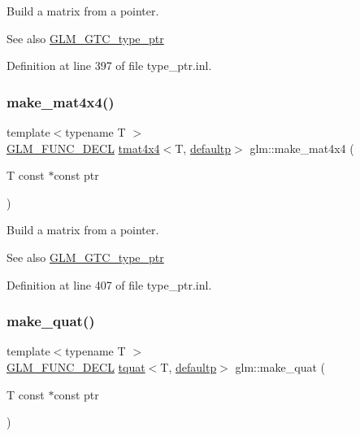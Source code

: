 Build a matrix from a pointer. \begin{DoxySeeAlso}{See also}
\mbox{\hyperlink{group__gtc__type__ptr}{G\+L\+M\+\_\+\+G\+T\+C\+\_\+type\+\_\+ptr}} 
\end{DoxySeeAlso}


Definition at line 397 of file type\+\_\+ptr.\+inl.

\mbox{\label{group__gtc__type__ptr_gaf605a5f5e2ff594e8d404b2855b09541}} 
\subsubsection{\texorpdfstring{make\_mat4x4()}{make\_mat4x4()}}
{\footnotesize\ttfamily template$<$typename T $>$ \\
\mbox{\hyperlink{setup_8hpp_ab2d052de21a70539923e9bcbf6e83a51}{G\+L\+M\+\_\+\+F\+U\+N\+C\+\_\+\+D\+E\+CL}} \mbox{\hyperlink{structglm_1_1tmat4x4}{tmat4x4}}$<$T, \mbox{\hyperlink{namespaceglm_a0f04f086094c747d227af4425893f545a9d21ccd8b5a009ec7eb7677befc3bf51}{defaultp}}$>$ glm\+::make\+\_\+mat4x4 (\begin{DoxyParamCaption}\item[{T const $\ast$const}]{ptr }\end{DoxyParamCaption})}

Build a matrix from a pointer. \begin{DoxySeeAlso}{See also}
\mbox{\hyperlink{group__gtc__type__ptr}{G\+L\+M\+\_\+\+G\+T\+C\+\_\+type\+\_\+ptr}} 
\end{DoxySeeAlso}


Definition at line 407 of file type\+\_\+ptr.\+inl.

\mbox{\label{group__gtc__type__ptr_gaadafb6600af2633e4c98cc64c72f5269}} 
\subsubsection{\texorpdfstring{make\_quat()}{make\_quat()}}
{\footnotesize\ttfamily template$<$typename T $>$ \\
\mbox{\hyperlink{setup_8hpp_ab2d052de21a70539923e9bcbf6e83a51}{G\+L\+M\+\_\+\+F\+U\+N\+C\+\_\+\+D\+E\+CL}} \mbox{\hyperlink{structglm_1_1tquat}{tquat}}$<$T, \mbox{\hyperlink{namespaceglm_a0f04f086094c747d227af4425893f545a9d21ccd8b5a009ec7eb7677befc3bf51}{defaultp}}$>$ glm\+::make\+\_\+quat (\begin{DoxyParamCaption}\item[{T const $\ast$const}]{ptr }\end{DoxyParamCaption})}

